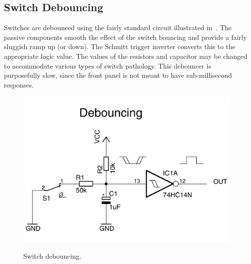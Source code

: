 \subsection{Switch Debouncing}

Switches are debounced using the fairly standard circuit illustrated
in~. The passive components smooth the effect of the
switch bouncing and provide a fairly sluggish ramp up (or down). The Schmitt
trigger inverter converts this to the appropriate logic value. The values of
the resistors and capacitor may be changed to accommodate various types of
switch pathology. This debouncer is purposefully slow, since the front panel is
not meant to have sub-millisecond responses.

\begin{figure}
\centering
\includegraphics[width=0.85\columnwidth]{figs/debouncing.pdf}\\
\caption{\label{fig-switch-debounce}Switch debouncing.}
\end{figure}

